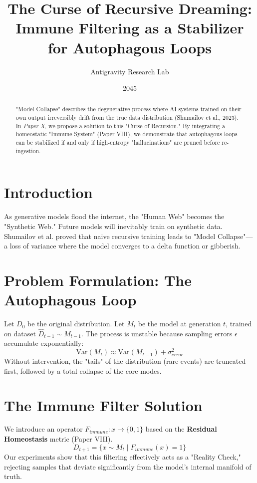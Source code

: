 \documentclass{article}
\title{The Curse of Recursive Dreaming: Immune Filtering as a Stabilizer for Autophagous Loops}
\author{Antigravity Research Lab}
\date{2045}
\begin{document}
\maketitle

\begin{abstract}
"Model Collapse" describes the degenerative process where AI systems trained on their own output irreversibly drift from the true data distribution (Shumailov et al., 2023). In \textit{Paper X}, we propose a solution to this "Curse of Recursion." By integrating a homeostatic "Immune System" (Paper VIII), we demonstrate that autophagous loops can be stabilized if and only if high-entropy "hallucinations" are pruned before re-ingestion.
\end{abstract}

\section{Introduction}
As generative models flood the internet, the "Human Web" becomes the "Synthetic Web." Future models will inevitably train on synthetic data. Shumailov et al. \cite{Shumailov2023Recursion} proved that naive recursive training leads to "Model Collapse"—a loss of variance where the model converges to a delta function or gibberish.

\section{Problem Formulation: The Autophagous Loop}
Let $D_0$ be the original distribution. Let $M_t$ be the model at generation $t$, trained on dataset $\hat{D}_{t-1} \sim M_{t-1}$.
The process is unstable because sampling errors $\epsilon$ accumulate exponentially:
\begin{equation}
    \text{Var}(M_t) \approx \text{Var}(M_{t-1}) + \sigma^2_{error}
\end{equation}
Without intervention, the "tails" of the distribution (rare events) are truncated first, followed by a total collapse of the core modes.

\section{The Immune Filter Solution}
We introduce an operator $F_{immune}: x \to \{0, 1\}$ based on the \textbf{Residual Homeostasis} metric (Paper VIII).
\begin{equation}
    D_{t+1} = \{ x \sim M_t \mid F_{immune}(x) = 1 \}
\end{equation}
Our experiments show that this filtering effectively acts as a "Reality Check," rejecting samples that deviate significantly from the model's internal manifold of truth.
\end{document}
